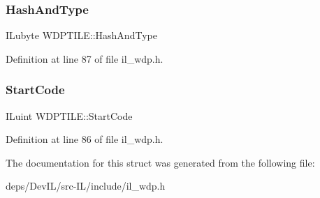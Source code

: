 \subsubsection{\texorpdfstring{Hash\+And\+Type}{HashAndType}}
{\footnotesize\ttfamily I\+Lubyte W\+D\+P\+T\+I\+L\+E\+::\+Hash\+And\+Type}



Definition at line 87 of file il\+\_\+wdp.\+h.

\mbox{\label{structWDPTILE_ab136327a83a62bf49a99f4a489d7becd}} 
\subsubsection{\texorpdfstring{Start\+Code}{StartCode}}
{\footnotesize\ttfamily I\+Luint W\+D\+P\+T\+I\+L\+E\+::\+Start\+Code}



Definition at line 86 of file il\+\_\+wdp.\+h.



The documentation for this struct was generated from the following file\+:\begin{DoxyCompactItemize}
\item 
deps/\+Dev\+I\+L/src-\/\+I\+L/include/il\+\_\+wdp.\+h\end{DoxyCompactItemize}
